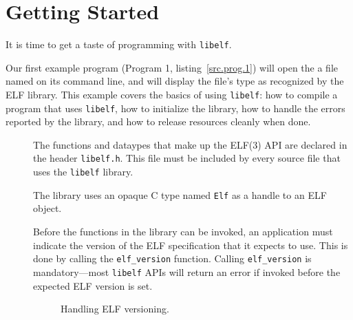 \documentclass[a4paper,pdftex]{book}
\makeatletter
\newcommand{\function}[1]{\texttt{#1}}
\newcommand{\filename}[1]{\texttt{#1}}
\newcommand{\library}[1]{\texttt{#1}}
\newcommand{\type}[1]{\texttt{#1}}
\newenvironment{callout}[2][black]{%
  \begingroup\newcommand{\@cocolor}{#1}%
  \setlength{\shadowsize}{1.2pt}%
  \newcommand{\@cogroup}[1]{#2}}{\endgroup}
\newcommand{\@co}[1]{\shadowbox{\color{\@cocolor}#1}}
\newcommand{\coref}[1]{%
  \hypertarget{\@cogroup.#1.cr}{%
    \hyperlink{\@cogroup.#1.co}{\@co{#1}}}}
\makeatother
\begin{document}
\chapter{Getting Started}\label{chap.getting-started}

It is time to get a taste of programming with \library{libelf}.

Our first example program (Program 1, listing~\vref{src.prog.1}) will
open the a file named on its command line, and will display the file's
type as recognized by the ELF library.  This example covers the basics
of using \library{libelf}: how to compile a program that uses
\library{libelf}, how to initialize the library, how to handle the
errors reported by the library, and how to release resources cleanly
when done.

\begin{callout}{prog1}
  

  \begin{description}
  \item[\coref{1}] The functions and dataypes that make up the ELF(3)
    API are declared in the header \filename{libelf.h}.  This file
    must be included by every source file that uses the
    \library{libelf} library.%
    \index{libelf@\library{libelf}!header \filename{elf.h}}

  \item[\coref{2}] The library uses an opaque C type named \type{Elf}
    as a handle to an ELF object.

  \item[\coref{4}] Before the functions in the library can be invoked,
    an application must indicate the version of the ELF specification
    that it expects to use.  This is done by calling the
    \function{elf\_version} function. Calling \function{elf\_version}
    is mandatory---most \library{libelf} APIs will return an error if
    invoked before the expected ELF version is set.

    \begin{figure}
      \caption{Handling ELF versioning.}\label{fig.versions}
    \end{figure}


\end{description}
\end{callout}
\end{document}
